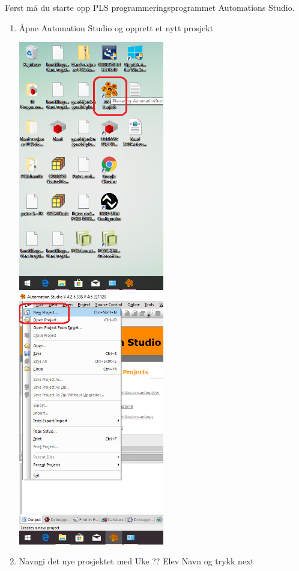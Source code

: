 Først må du starte opp PLS programmeringsprogrammet Automations Studio. 
\begin{enumerate}
\item Åpne Automation Studio og opprett et nytt prosjekt

\includegraphics[width=0.5\textwidth]{stasjon07x09.png}
\includegraphics[width=0.5\textwidth]{stasjon07x01.png}

\newpage{}
\item Navngi det nye prosjektet med Uke ?? Elev Navn og trykk next


\end{enumerate}
